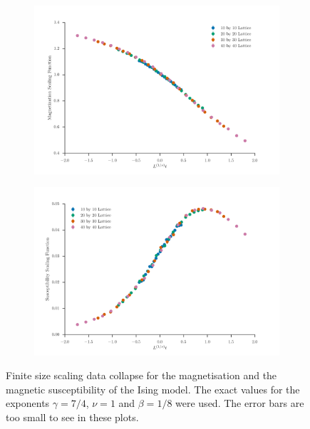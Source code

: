 \documentclass[11pt, a4paper]{report} %
\begin{document}
\begin{figure}[htb]
	\centering
	\begin{subfigure}{\textwidth}
		\includegraphics[width=\textwidth]{ising_magnetization_exact_data_collapse.pdf}
	\end{subfigure}

	\begin{subfigure}{\textwidth}
		\includegraphics[width=\textwidth]{ising_susceptibility_exact_data_collapse.pdf}
	\end{subfigure}
	\caption{Finite size scaling data collapse for the magnetisation and the magnetic susceptibility of the Ising model. The exact values for the exponents \(\gamma = 7/4\), \(\nu=1\) and \(\beta=1/8\) were used. The error bars are too small to see in these plots.}
	\label{fig:ising_data_collapse}
\end{figure}
\end{document}
